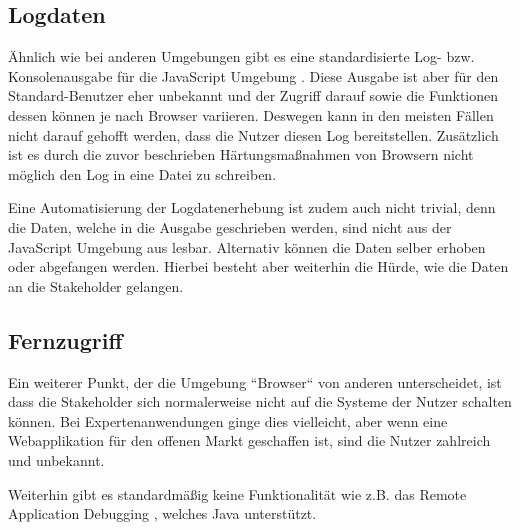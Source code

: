 \subsection{Logdaten}

Ähnlich wie bei anderen Umgebungen gibt es eine standardisierte Log- bzw. Konsolenausgabe für die JavaScript Umgebung \cite{MDNConsole}. Diese Ausgabe ist aber für den Standard-Benutzer eher unbekannt und der Zugriff darauf sowie die Funktionen dessen können je nach Browser variieren. Deswegen kann in den meisten Fällen nicht darauf gehofft werden, dass die Nutzer diesen Log bereitstellen. Zusätzlich ist es durch die zuvor beschrieben Härtungsmaßnahmen von Browsern nicht möglich den Log in eine Datei zu schreiben.

Eine Automatisierung der Logdatenerhebung ist zudem auch nicht trivial, denn die Daten, welche in die Ausgabe geschrieben werden, sind nicht aus der JavaScript Umgebung aus lesbar. Alternativ können die Daten selber erhoben oder abgefangen werden. Hierbei besteht aber weiterhin die Hürde, wie die Daten an die Stakeholder gelangen.

\subsection{Fernzugriff}

Ein weiterer Punkt, der die Umgebung ``Browser`` von anderen unterscheidet, ist dass die Stakeholder sich normalerweise nicht auf die Systeme der Nutzer schalten können. Bei Expertenanwendungen ginge dies vielleicht, aber wenn eine Webapplikation für den offenen Markt geschaffen ist, sind die Nutzer zahlreich und unbekannt.

Weiterhin gibt es standardmäßig keine Funktionalität wie z.B. das Remote Application Debugging \cite{JavaDebugWireProtocol}, welches Java unterstützt.
